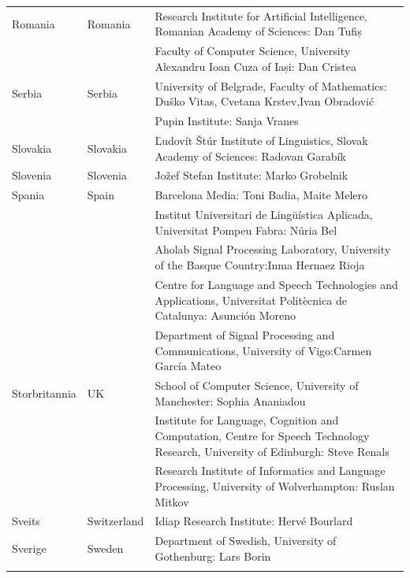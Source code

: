 \begin{longtable}{llp{114mm}}
  Romania & \textcolor{grey1}{Romania} & Research Institute for Artificial Intelligence, Romanian Academy of Sciences: Dan Tufiș \\ \addlinespace
  & & Faculty of Computer Science, University Alexandru Ioan Cuza of Iași: Dan Cristea \\ \addlinespace
   Serbia & \textcolor{grey1}{Serbia} & University of Belgrade, Faculty of Mathematics: Duško Vitas, Cvetana Krstev,\newline Ivan Obradović \\ \addlinespace
  & & Pupin Institute: Sanja Vranes \\ \addlinespace  
  Slovakia  & \textcolor{grey1}{Slovakia} & Ľudovít Štúr Institute of Linguistics, Slovak Academy of Sciences: Radovan Garabík \\ \addlinespace 
  Slovenia  & \textcolor{grey1}{Slovenia} & Jožef Stefan Institute: Marko Grobelnik \\ \addlinespace 
  Spania & \textcolor{grey1}{Spain} & Barcelona Media: Toni Badia, Maite Melero \\ \addlinespace 
  & & Institut Universitari de Lingüística Aplicada, Universitat Pompeu Fabra: Núria Bel \\ \addlinespace 
  & & Aholab Signal Processing Laboratory, University of the Basque Country:\newline Inma Hernaez Rioja \\ \addlinespace 
  & & Centre for Language and Speech Technologies and Applications, Universitat Politècnica de Catalunya:  Asunción Moreno \\ \addlinespace 
  & & Department of Signal Processing and Communications, University of Vigo:\newline Carmen García Mateo \\ \addlinespace 
  Storbritannia & \textcolor{grey1}{UK} &  School of Computer Science, University of Manchester: Sophia Ananiadou \\ \addlinespace 
  & & Institute for Language, Cognition and Computation, Centre for Speech Technology Research, University of Edinburgh: Steve Renals \\ \addlinespace 
  & & Research Institute of Informatics and Language Processing, University of Wolverhampton: Ruslan Mitkov \\ \addlinespace 
  Sveits  & \textcolor{grey1}{Switzerland} & Idiap Research Institute: Hervé Bourlard \\ \addlinespace  
  Sverige& \textcolor{grey1}{Sweden} & Department of Swedish, University of Gothenburg: Lars Borin \\ \addlinespace 

\end{longtable}
